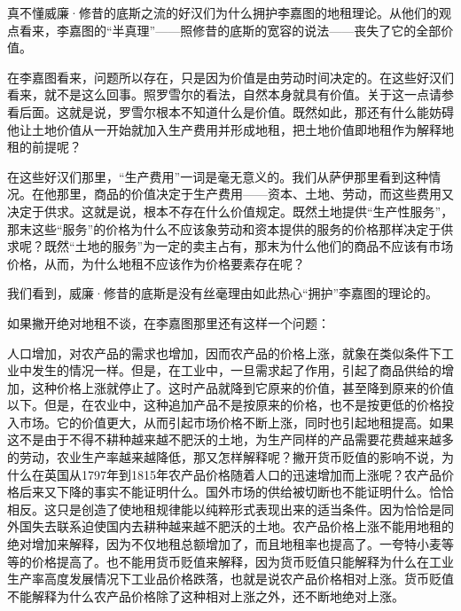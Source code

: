 真不懂威廉·修昔的底斯之流的好汉们为什么拥护李嘉图的地租理论。从他们的观点看来，李嘉图的“半真理”——照修昔的底斯的宽容的说法——丧失了它的全部价值。

在李嘉图看来，问题所以存在，只是因为价值是由劳动时间决定的。在这些好汉们看来，就不是这么回事。照罗雪尔的看法，自然本身就具有价值。关于这一点请参看后面。这就是说，罗雪尔根本不知道什么是价值。既然如此，那还有什么能妨碍他让土地价值从一开始就加入生产费用并形成地租，把土地价值即地租作为解释地租的前提呢？

在这些好汉们那里，“生产费用”一词是毫无意义的。我们从萨伊那里看到这种情况。在他那里，商品的价值决定于生产费用——资本、土地、劳动，而这些费用又决定于供求。这就是说，根本不存在什么价值规定。既然土地提供“生产性服务”，那末这些“服务”的价格为什么不应该象劳动和资本提供的服务的价格那样决定于供求呢？既然“土地的服务”为一定的卖主占有，那末为什么他们的商品不应该有市场价格，从而，为什么地租不应该作为价格要素存在呢？

我们看到，威廉·修昔的底斯是没有丝毫理由如此热心“拥护”李嘉图的理论的。


如果撇开绝对地租不谈，在李嘉图那里还有这样一个问题：

人口增加，对农产品的需求也增加，因而农产品的价格上涨，就象在类似条件下工业中发生的情况一样。但是，在工业中，一旦需求起了作用，引起了商品供给的增加，这种价格上涨就停止了。这时产品就降到它原来的价值，甚至降到原来的价值以下。但是，在农业中，这种追加产品不是按原来的价格，也不是按更低的价格投入市场。它的价值更大，从而引起市场价格不断上涨，同时也引起地租提高。如果这不是由于不得不耕种越来越不肥沃的土地，为生产同样的产品需要花费越来越多的劳动，农业生产率越来越降低，那又怎样解释呢？撇开货币贬值的影响不说，为什么在英国从1797年到1815年农产品价格随着人口的迅速增加而上涨呢？农产品价格后来又下降的事实不能证明什么。国外市场的供给被切断也不能证明什么。恰恰相反。这只是创造了使地租规律能以纯粹形式表现出来的适当条件。因为恰恰是同外国失去联系迫使国内去耕种越来越不肥沃的土地。农产品价格上涨不能用地租的绝对增加来解释，因为不仅地租总额增加了，而且地租率也提高了。一夸特小麦等等的价格提高了。也不能用货币贬值来解释，因为货币贬值只能解释为什么在工业生产率高度发展情况下工业品价格跌落，也就是说农产品价格相对上涨。货币贬值不能解释为什么农产品价格除了这种相对上涨之外，还不断地绝对上涨。

